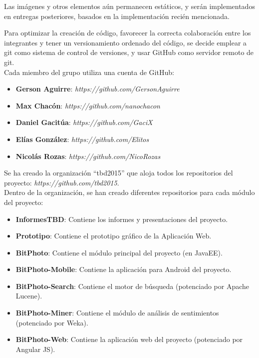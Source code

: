 \documentclass{memoria}
\begin{document}
Las imágenes y otros elementos aún permanecen estáticos, y serán implementados en entregas posteriores, basados en la implementación recién mencionada.



    
Para optimizar la creación de código, favorecer la correcta colaboración entre los integrantes y tener un versionamiento ordenado del código, se decide emplear a git como sistema de control de versiones, y usar GitHub como servidor remoto de git.\\

Cada miembro del grupo utiliza una cuenta de GitHub:

\begin{itemize}
	\item \textbf{Gerson Aguirre}: \textsl{https://github.com/GersonAguirre}
	\item \textbf{Max Chacón}: \textsl{https://github.com/nanochacon}
	\item \textbf{Daniel Gacitúa}: \textsl{https://github.com/GaciX}
	\item \textbf{Elías González}: \textsl{https://github.com/Elitos}
	\item \textbf{Nicolás Rozas}: \textsl{https://github.com/NicoRozas}
\end{itemize}

Se ha creado la organización “tbd2015” que aloja todos los repositorios del proyecto: \textsl{https://github.com/tbd2015}.\\

Dentro de la organización, se han creado diferentes repositorios para cada módulo del proyecto:

\begin{itemize}
	\item \textbf{InformesTBD}: Contiene los informes y presentaciones del proyecto. 
	\item \textbf{Prototipo}: Contiene el prototipo gráfico de la Aplicación Web.
	\item \textbf{BitPhoto}: Contiene el módulo principal del proyecto (en JavaEE).
	\item \textbf{BitPhoto-Mobile}: Contiene la aplicación para Android del proyecto.
	\item \textbf{BitPhoto-Search}: Contiene el motor de búsqueda (potenciado por Apache Lucene).
	\item \textbf{BitPhoto-Miner}: Contiene el módulo de análisis de sentimientos (potenciado por Weka).
	\item \textbf{BitPhoto-Web}: Contiene la aplicación web del proyecto (potenciado por Angular JS).
\end{itemize}
\end{document}
